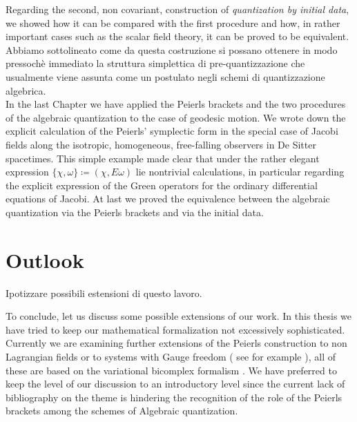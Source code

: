 \documentclass[Main]{subfiles}
\begin{document}
Regarding the second, non covariant, construction of \emph{quantization by initial data}, we showed how it can be compared with the first procedure and how, in rather important cases such as the scalar field theory, it can be proved to be equivalent.
\ifToninus
Abbiamo sottolineato come da questa costruzione si possano ottenere in modo pressochè immediato la struttura simplettica di pre-quantizzazione che usualmente viene assunta come un postulato negli schemi di quantizzazione algebrica.
\fi
\\
In the last Chapter we have applied the Peierls brackets and the two procedures of the algebraic quantization to the case of geodesic motion.
We wrote down the explicit calculation of the Peierls' symplectic form in the special case of Jacobi fields along the isotropic, homogeneous, free-falling  observers in De Sitter spacetimes. This simple example made clear that under the rather elegant expression $\{\chi, \omega\} \coloneqq ( \chi, E \omega)$ lie nontrivial calculations, in particular regarding the explicit expression of the Green operators for the ordinary differential equations of Jacobi.
At last we proved the equivalence between the algebraic quantization via the Peierls brackets and via the initial data.

\vspace{2mm}%

\ifToninus
\section{Outlook}
Ipotizzare possibili estensioni di questo lavoro.

\fi
To conclude, let us discuss  some possible extensions of our work.
	In this thesis we have tried to keep our mathematical formalization not excessively sophisticated.
	Currently we are examining further extensions of the Peierls construction to non Lagrangian fields or to systems with Gauge freedom ( see for example \cite{Khavkine2014} ), all of these are based on the variational bicomplex formalism \cite{G.Sardanashvily2013}.
	We have preferred to keep the level of our discussion to an introductory level since the current lack of bibliography on the theme is hindering the recognition of the role of the Peierls brackets among the schemes of Algebraic quantization.
\end{document}
